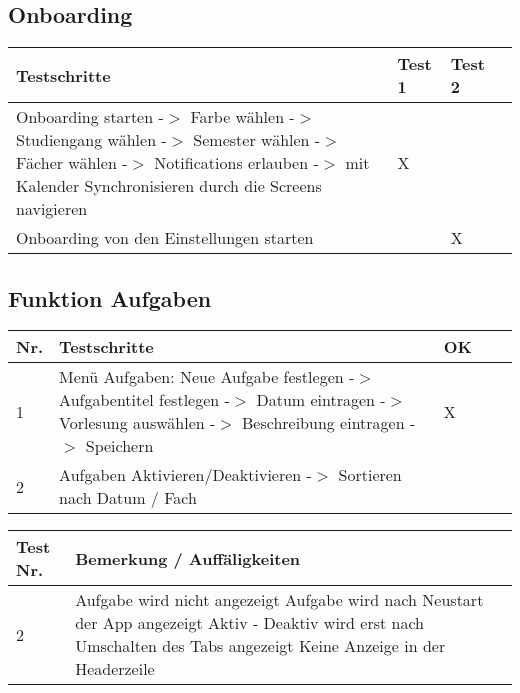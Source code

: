\subsection{Onboarding}
\noindent%
\begin{tabularx}{\textwidth}{|p{}|X|X|X }
\hline
\textbf{Testschritte} &\textbf{Test 1} &\textbf{Test 2}  \\ \hline 

Onboarding starten -$>$ Farbe wählen -$>$ Studiengang wählen -$>$ Semester wählen -$>$ Fächer wählen -$>$ Notifications erlauben -$>$ mit Kalender Synchronisieren  durch die Screens navigieren & X &    \\ \hline

Onboarding von den Einstellungen starten &  & X   \\ \hline

\end{tabularx}
 \newline
\newline

\subsection{Funktion Aufgaben}

\noindent%
\begin{tabularx}{\textwidth}{|p{}|p{}|X|X|X| }
\hline
\textbf{Nr.} &\textbf{Testschritte} &\textbf{OK}   \\ \hline 
1 & Menü Aufgaben: Neue Aufgabe festlegen -$>$ Aufgabentitel festlegen -$>$ Datum eintragen -$>$ Vorlesung auswählen -$>$ Beschreibung eintragen -$>$ Speichern & X     \\ \hline
2 & Aufgaben Aktivieren/Deaktivieren -$>$ Sortieren nach Datum / Fach &     \\ \hline
\end{tabularx}
 \newline
  \newline

\noindent%
\begin{tabularx}{\textwidth}{|p{}|X|X| }
\hline
\textbf{Test Nr.} &\textbf{Bemerkung / Auffäligkeiten}   \\ \hline 
 2 & 
Aufgabe wird nicht angezeigt
Aufgabe wird nach Neustart der App angezeigt
Aktiv - Deaktiv wird erst nach Umschalten des Tabs angezeigt 
Keine Anzeige in der Headerzeile  \\ \hline
\end{tabularx}
\newline
\newline

